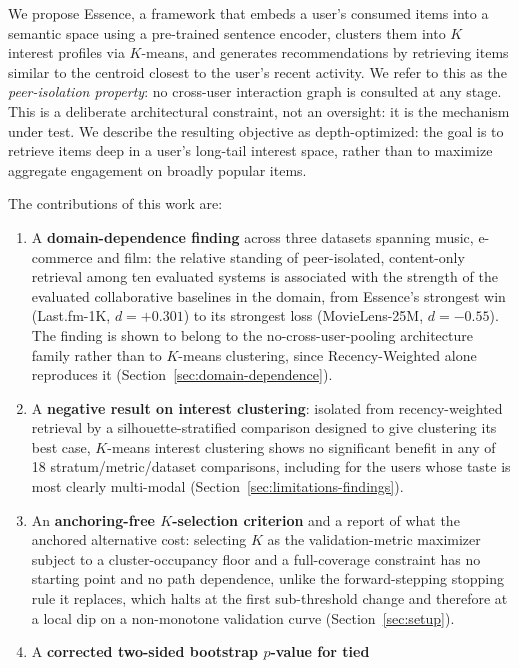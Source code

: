 \documentclass[11pt,a4paper]{article}
\begin{document}
We propose Essence, a framework that embeds a user's consumed items into a
semantic space using a pre-trained sentence encoder, clusters them into $K$
interest profiles via $K$-means, and generates recommendations by retrieving
items similar to the centroid closest to the user's recent activity. We refer
to this as the \emph{peer-isolation property}: no cross-user interaction graph
is consulted at any stage. This is a deliberate architectural constraint, not
an oversight: it is the mechanism under test. We describe the resulting objective as depth-optimized: the goal is to retrieve items deep in a user's long-tail interest space, rather than to maximize aggregate engagement on broadly popular items.

The contributions of this work are:
\begin{enumerate}[leftmargin=*, itemsep=2pt]
  \item A \textbf{domain-dependence finding} across three datasets spanning
        music, e-commerce and film: the relative standing of peer-isolated,
        content-only retrieval among ten evaluated systems is associated with
        the strength of the evaluated collaborative baselines in the domain,
        from Essence's strongest win (Last.fm-1K, $d=+0.301$) to its
        strongest loss (MovieLens-25M, $d=-0.55$). The finding is shown
        to belong to the no-cross-user-pooling architecture family rather than
        to $K$-means clustering, since Recency-Weighted alone reproduces it
        (Section~\ref{sec:domain-dependence}).
  \item A \textbf{negative result on interest clustering}: isolated from
        recency-weighted retrieval by a silhouette-stratified comparison
        designed to give clustering its best case, $K$-means interest
        clustering shows no significant benefit in any of 18
        stratum/metric/dataset comparisons, including for the users whose
        taste is most clearly multi-modal
        (Section~\ref{sec:limitations-findings}).
  \item An \textbf{anchoring-free $K$-selection criterion} and a report of
        what the anchored alternative cost: selecting $K$ as the
        validation-metric maximizer subject to a cluster-occupancy floor and
        a full-coverage constraint has no starting point and no path
        dependence, unlike the forward-stepping stopping rule it replaces,
        which halts at the first sub-threshold change and therefore at a local
        dip on a non-monotone validation curve (Section~\ref{sec:setup}).
  \item A \textbf{corrected two-sided bootstrap $p$-value for tied
}
\end{enumerate}
\end{document}
